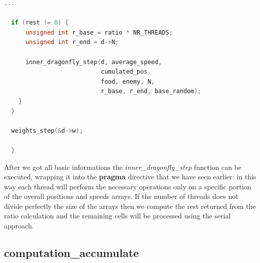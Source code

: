 \documentclass[10pt]{article}
\begin{document}
\begin{multicols}{2}
\begin{lstlisting}[language=C,caption={parallelized dragonfly-compute-step}]
  ...

  if (rest != 0) {
      unsigned int r_base = ratio * NR_THREADS;
      unsigned int r_end = d->N;

      inner_dragonfly_step(d, average_speed, 
                           cumulated_pos, 
                           food, enemy, N,
                           r_base, r_end, base_random);
    }
  }

  weights_step(&d->w);
  
  }

\end{lstlisting}


\noindent After we got all basic informations the \textit{inner\_dragonfly\_step}
function can be executed, wrapping it into the \textbf{pragma} directive that we have seen earlier: in this way each thread will 
perform the necessary operations only on a specific portion of the overall positions and speeds arrays.
If the number of threads does not divide perfectly the size of the arrays then we compute the rest
returned from the ratio calculation and the remaining cells will be processed using the serial approach.

\subsection*{computation\_accumulate}


\end{multicols}
\end{document}
